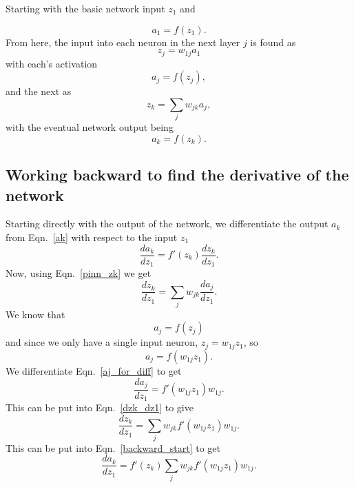 \documentclass[12pt]{article}
\begin{document}
Starting with the basic network input $z_1$ and

\begin{equation}
a_1=f(z_1).
\end{equation}
From here, the input into each neuron in the next layer $j$ is found as
\begin{equation}
z_j=w_{1j}a_1
\end{equation}
with each's activation 
\begin{equation}
\label{pinn_aj}
a_j=f(z_j),
\end{equation}
and the next as 
\begin{equation}
\label{pinn_zk}
z_k=\sum_j w_{jk} a_j,
\end{equation}
with the eventual network output being
\begin{equation}
\label{ak}
a_k=f(z_k).
\end{equation}

\subsection{Working backward to find the derivative of the network}
\label{dforward}

Starting directly with the output of the network, we differentiate the output $a_k$ from Eqn.~\ref{ak} with respect to the input $z_1$
\begin{equation}
\label{backward_start}
\frac{da_k}{dz_1}=f'(z_k)\frac{dz_k}{dz_1}.
\end{equation}
Now, using Eqn.~\ref{pinn_zk} we get
\begin{equation}
\label{dzk_dz1}
\frac{dz_k}{dz_1}=\sum_j w_{jk}\frac{da_j}{dz_1}.
\end{equation}
We know that
\begin{equation}
a_j=f(z_j)
\end{equation}
and since we only have a single input neuron, $z_j=w_{1j}z_1$, so
\begin{equation}
\label{aj_for_diff}
a_j=f(w_{1j}z_1).
\end{equation}
We differentiate Eqn.~\ref{aj_for_diff} to get 
\begin{equation}
\frac{da_j}{dz_1}=f'(w_{1j}z_1)w_{1j}.
\end{equation}
This can be put into Eqn.~\ref{dzk_dz1} to give
\begin{equation}
\frac{dz_k}{dz_1}=\sum_j w_{jk}f'(w_{1j}z_1)w_{1j}.
\end{equation}
This can be put into Eqn.~\ref{backward_start} to get
\begin{equation}
\frac{da_k}{dz_1}=f'(z_k)\sum_j w_{jk}f'(w_{1j}z_1)w_{1j}.
\end{equation}
\end{document}
